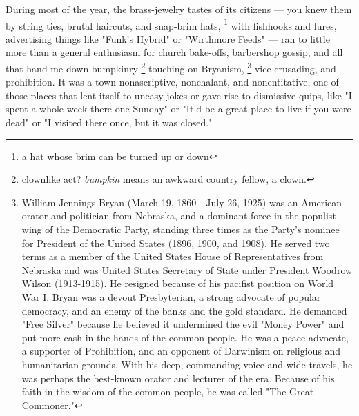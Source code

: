  During most of the year, the brass-jewelry tastes of its citizens --- you knew
them by string ties, brutal haircuts, and snap-brim hats, 
\footnote{a hat whose brim can be turned up or down}
with fishhooks and lures, 
advertising things like "Funk's Hybrid" or "Wirthmore Feeds" --- ran to
little more than a general enthusiasm for church bake-offs, barbershop gossip,
and all that hand-me-down bumpkinry 
\footnote{\textdbend clownlike act? \textit{bumpkin} means an awkward country
    fellow, a clown.}
touching on Bryanism, 
\footnote{\textdbend William Jennings Bryan (March 19, 1860 - July
26, 1925) was an American orator and politician from Nebraska, and a dominant
force in the populist wing of the Democratic Party, standing three times as the
Party's nominee for President of the United States (1896, 1900, and 1908). He
served two terms as a member of the United States House of Representatives from
Nebraska and was United States Secretary of State under President Woodrow Wilson
(1913-1915). He resigned because of his pacifist position on World War I. Bryan
was a devout Presbyterian, a strong advocate of popular democracy, and an enemy
of the banks and the gold standard. He demanded "Free Silver" because he
believed it undermined the evil "Money Power" and put more cash in the hands of
the common people. He was a peace advocate, a supporter of Prohibition, and an
opponent of Darwinism on religious and humanitarian grounds. With his deep,
commanding voice and wide travels, he was perhaps the best-known orator and
lecturer of the era. Because of his faith in the wisdom of the common people, he
was called "The Great Commoner."
}
vice-crusading, and prohibition. It was a town nonascriptive, 
nonchalant, 
and nonentitative, 
one of those places that lent itself to uneasy jokes or gave rise to 
dismissive quips,
like "I spent a whole week there one Sunday" or "It'd be a great place to live
if you were dead" or "I visited there once, but it was closed."

